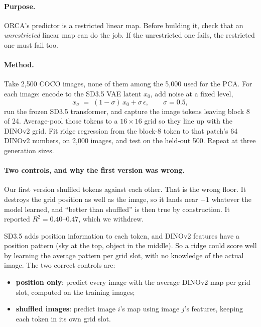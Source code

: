 \documentclass[11pt]{article}
\begin{document}
\paragraph{Purpose.} ORCA's predictor is a restricted linear map. Before building it, check that an
\emph{unrestricted} linear map can do the job. If the unrestricted one fails, the restricted one
must fail too.

\paragraph{Method.} Take 2{,}500 COCO images, none of them among the 5{,}000 used for the PCA. For
each image: encode to the SD3.5 VAE latent $x_0$, add noise at a fixed level,
\begin{equation}
x_\sigma \;=\; (1-\sigma)\,x_0 + \sigma\,\epsilon, \qquad \sigma = 0.5,
\end{equation}
run the frozen SD3.5 transformer, and capture the image tokens leaving block 8 of 24. Average-pool
those tokens to a $16\times16$ grid so they line up with the DINOv2 grid. Fit ridge regression from
the block-8 token to that patch's 64 DINOv2 numbers, on 2{,}000 images, and test on the held-out 500.
Repeat at three generation sizes.

\paragraph{Two controls, and why the first version was wrong.}

Our first version shuffled tokens against each other. That is the wrong floor. It destroys the grid
position as well as the image, so it lands near $-1$ whatever the model learned, and ``better than
shuffled'' is then true by construction. It reported $R^2 = 0.40$--$0.47$, which we withdrew.

SD3.5 adds position information to each token, and DINOv2 features have a position pattern (sky at
the top, object in the middle). So a ridge could score well by learning the average pattern per grid
slot, with no knowledge of the actual image. The two correct controls are:

\begin{itemize}
  \item \textbf{position only}: predict every image with the average DINOv2 map per grid slot,
        computed on the training images;
  \item \textbf{shuffled images}: predict image $i$'s map using image $j$'s features, keeping each
        token in its own grid slot.
\end{itemize}
\end{document}
